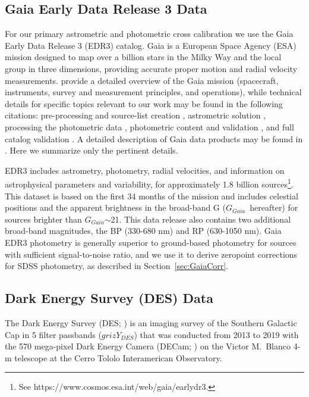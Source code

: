 \documentclass[fleqn,usenatbib]{mnras}
\newcommand{\GG}{\hbox{$G_{Gaia}$}}
\begin{document}
\subsection{Gaia Early Data Release 3 Data} \label{ssec:gaia}
 
For our primary astrometric and photometric cross calibration we use the Gaia Early Data Release 3 (EDR3) catalog.  Gaia is a European Space Agency (ESA) mission designed to map over a billion stars in the Milky Way and the local group in three dimensions, providing accurate proper motion and radial velocity measurements. \citet{GaiaCollab2016} provide a detailed overview of the Gaia mission (spacecraft, instruments, survey and measurement principles, and operations), while technical details for specific topics relevant to our work may be found in the following citations: pre-processing and source-list creation \citep{Fabr2016}, astrometric solution \citep{LInd2018}, processing the photometric data \citep{Riel2018}, photometric content and validation \citep{Evan2018}, and full catalog validation \citep{Aren2018}. A detailed description of Gaia data products  
may be found in \citet{GaiaCollab2018b}. Here we summarize only the pertinent details.

EDR3 includes astrometry, photometry, radial velocities, and information on astrophysical parameters and variability, for approximately 1.8 billion sources\footnote{See https://www.cosmos.esa.int/web/gaia/earlydr3.}. This dataset is based on the first 34 months of the mission and includes celestial positions and the apparent brightness in the broad-band G (\GG\ hereafter) for sources brighter than \GG$\sim$21.  This data release also contains two additional broad-band magnitudes, the BP (330-680 nm) and RP (630-1050 nm). Gaia EDR3 photometry is generally superior to ground-based photometry for sources with sufficient signal-to-noise ratio, and we use it to derive zeropoint corrections for SDSS photometry, as described in Section~\ref{sec:GaiaCorr}. 
 

\subsection{Dark Energy Survey (DES) Data} \label{ssec:des}


The Dark Energy Survey (DES; \citealt{2016MNRAS.460.1270D}) is an imaging survey of the Southern Galactic Cap in 5 filter passbands ($grizY_{DES}$) that was conducted from 2013 to 2019 with the 570 mega-pixel Dark Energy Camera (DECam;
\citealt{2008arXiv0810.3600H,2015AJ....150..150F}) on the Victor M.\ Blanco 4-m telescope at the Cerro Tololo Interamerican
Observatory.
\end{document}
